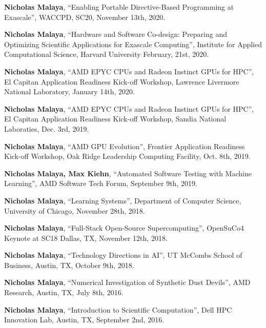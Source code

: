 
\textbf{Nicholas Malaya}, ``Enabling Portable Directive-Based Programming at Exascale'', WACCPD, SC20, November 13th, 2020. 

\blankline

\textbf{Nicholas Malaya}, ``Hardware and Software Co-design: Preparing and Optimizing Scientific Applications for Exascale Computing'', Institute for Applied Computational Science, Harvard University
		 February, 21st, 2020. 

\blankline

\textbf{Nicholas Malaya}, ``AMD EPYC CPUs and Radeon Instinct GPUs for HPC'', El Capitan Application Readiness Kick-off Workshop, Lawrence Livermore National Laboratory, 
		 January 14th, 2020. 

\blankline

\textbf{Nicholas Malaya}, ``AMD EPYC CPUs and Radeon Instinct GPUs for HPC'', El Capitan Application Readiness Kick-off Workshop, Sandia National Laboraties, 
		 Dec. 3rd, 2019. 

\blankline

\textbf{Nicholas Malaya}, ``AMD GPU Evolution'', Frontier Application Readiness Kick-off Workshop, Oak Ridge Leadership Computing Facility, 
		 Oct. 8th, 2019. 

\blankline

\textbf{Nicholas Malaya, Max Kiehn}, ``Automated Software Testing with Machine Learning'', AMD Software Tech Forum, 
		 September 9th, 2019. 

\blankline

\textbf{Nicholas Malaya}, ``Learning Systems'', Department of Computer Science, 
		 University of Chicago, November 28th, 2018. 

\blankline

\textbf{Nicholas Malaya}, ``Full-Stack Open-Source Supercomputing'', OpenSuCo4 Keynote at SC18
		 Dallas, TX, November 12th, 2018. 

\blankline


\textbf{Nicholas Malaya}, ``Technology Directions in AI'', UT McCombs School of Business, 
		 Austin, TX, October 9th, 2018. 

\blankline

\textbf{Nicholas Malaya}, ``Numerical Investigation of Synthetic Dust Devils'', AMD Research, 
		 Austin, TX, July 8th, 2016. 

\blankline

\textbf{Nicholas Malaya}, ``Introduction to Scientific Computation'', Dell HPC Innovation Lab, 
		 Austin, TX, September 2nd, 2016. 

